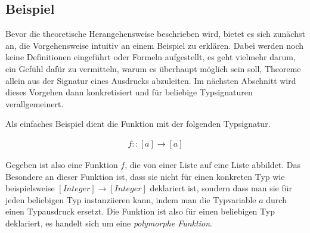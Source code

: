 

\subsection{Beispiel}

Bevor die theoretische Herangehensweise beschrieben wird, bietet es sich zunächst an, die Vorgehensweise intuitiv an einem
Beispiel zu erklären. Dabei werden noch keine Definitionen eingeführt oder Formeln aufgestellt, es geht vielmehr darum,
ein Gefühl dafür zu vermitteln, warum es überhaupt möglich sein soll, Theoreme allein aus der Signatur eines Ausdrucks
abzuleiten. Im nächsten Abschnitt wird dieses Vorgehen dann konkretisiert und für beliebige Typsignaturen verallgemeinert.

Als einfaches Beispiel dient die Funktion mit der folgenden Typsignatur.


\begin{align}
f :: [a] \rightarrow [a] \label{eq:fsig}
\end{align}

Gegeben ist also eine Funktion $f$, die von einer Liste auf eine Liste abbildet. Das Besondere an dieser Funktion ist, dass sie
nicht für einen konkreten Typ wie beispielsweise $[Integer] \rightarrow [Integer]$ deklariert ist, sondern dass man sie für jeden
beliebigen Typ instanziieren kann, indem man die Typvariable $a$ durch einen Typausdruck ersetzt. Die Funktion ist also für
einen beliebigen Typ deklariert, es handelt sich um eine \textit{polymorphe Funktion}.

